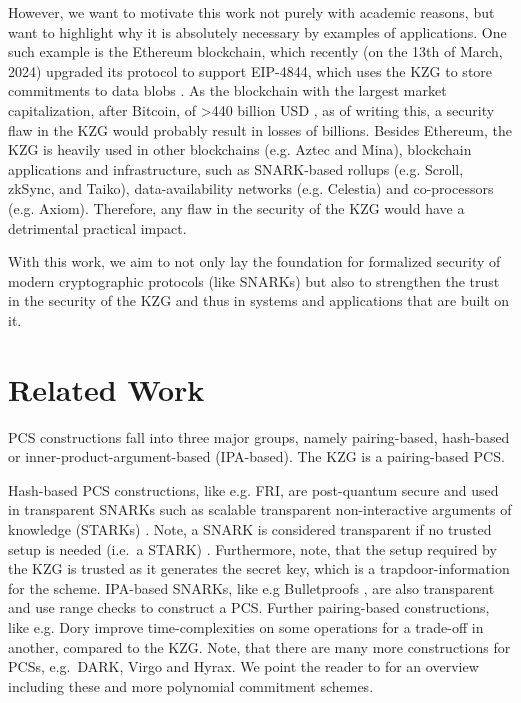 However, we want to motivate this work not purely with academic reasons, but want to highlight why it is absolutely necessary by examples of applications. One such example is the Ethereum blockchain, which recently (on the 13th of March, 2024) upgraded its protocol to support EIP-4844, which uses the KZG to store commitments to data blobs \parencite{EIP4844}. As the blockchain with the largest market capitalization, after Bitcoin, of >440 billion USD \parencite*{CoinMarketCap}, as of writing this, a security flaw in the KZG would probably result in losses of billions. Besides Ethereum, the KZG is heavily used in other blockchains (e.g. Aztec\parencite*{Aztec} and Mina\parencite*{Mina}), blockchain applications and infrastructure, such as SNARK-based rollups (e.g. Scroll\parencite*{Scroll}, zkSync\parencite*{zksync}, and Taiko\parencite*{Taiko}), data-availability networks (e.g. Celestia\parencite*{Celestia}) and co-processors (e.g. Axiom\parencite*{Axiom}). Therefore, any flaw in the security of the KZG would have a detrimental practical impact. 

With this work, we aim to not only lay the foundation for formalized security of modern cryptographic protocols (like SNARKs) but also to strengthen the trust in the security of the KZG and thus in systems and applications that are built on it.

\section*{Related Work}
PCS constructions fall into three major groups, namely pairing-based, hash-based or inner-product-argument-based (IPA-based). The KZG is a pairing-based PCS.

Hash-based PCS constructions, like e.g. FRI\parencite{FRI}, are post-quantum secure and used in transparent SNARKs such as scalable transparent non-interactive arguments of knowledge (STARKs) \parencite{STARK, FRI}. Note, a SNARK is considered transparent if no trusted setup is needed  (i.e.\ a STARK) \parencite{STARK}. Furthermore, note, that the setup required by the KZG is trusted as it generates the secret key, which is a trapdoor-information for the scheme. IPA-based SNARKs, like e.g Bulletproofs \parencite{Bulletproofs}, are also transparent and use range checks to construct a PCS. Further pairing-based constructions, like e.g. Dory \parencite*{Dory} improve time-complexities on some operations for a trade-off in another, compared to the KZG. 
Note, that there are many more constructions for PCSs, e.g.\ DARK\parencite*{DARK}, Virgo \parencite*{Virgo} and Hyrax\parencite*{Hyrax}. We point the reader to \parencite*{Dory} for an overview including these and more polynomial commitment schemes.

